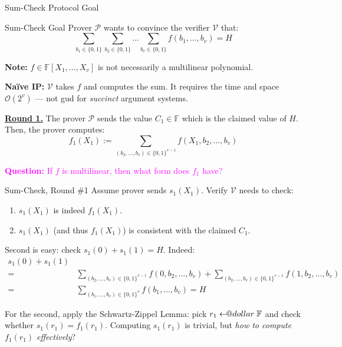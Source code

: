 \documentclass{zkdl-presentation-template}
\makeatletter
\newcommand\leftarrowS{\leftarrow\joinrel\smalldollar}
\newcommand{\smalldollar}{\mathrel{\mathpalette\small@dollar\relax}}
\newcommand{\small@dollar}[2]{%
  \vcenter{\hbox{%
    $#1\textnormal{\fontsize{0.7\dimexpr\f@size pt}{0}\selectfont\$}$%
  }}%
}
\makeatother
\begin{document}
    \begin{frame}{Sum-Check Protocol Goal}
        \begin{alertblock}{Sum-Check Goal}
            Prover $\mathcal{P}$ wants to convince the verifier $\mathcal{V}$ that:
            \begin{equation*}
                \sum_{b_1 \in \{0,1\}}\sum_{b_2 \in \{0,1\}}\dots \sum_{b_v \in \{0,1\}} f(b_1,\dots,b_v) = H
            \end{equation*}

            \pause\textbf{Note:} $f \in \mathbb{F}[X_1,\dots,X_v]$ is not necessarily
            a multilinear polynomial.\pause
        \end{alertblock}

        \textbf{Naïve IP:} $\mathcal{V}$ takes $f$ and computes the sum. It
        requires the time and space $\mathcal{O}(2^v)$ --- not gud for
        \textit{succinct} argument systems.\pause

        \underline{\textbf{Round 1.}} The prover $\mathcal{P}$ sends the value
        $C_1 \in \mathbb{F}$ which is the claimed value of $H$. \pause Then, the prover computes:
        \begin{equation*}
            f_1(X_1) := \sum_{(b_2,\dots,b_v) \in \{0,1\}^{v-1}}f(X_1,b_2,\dots,b_v)
        \end{equation*}
        
        \vspace{-12.5px}

        \pause\textcolor{magenta}{\textbf{Question:} If $f$ is multilinear, then what
        form does $f_1$ have?}
    \end{frame}

    \begin{frame}{Sum-Check, Round \#1}
        Assume prover sends $s_1(X_1)$. Verify $\mathcal{V}$ needs to check:
        \begin{enumerate}
            \item $s_1(X_1)$ is indeed $f_1(X_1)$.
            \item $s_1(X_1)$ (and thus $f_1(X_1)$) is consistent with the
            claimed $C_1$.
        \end{enumerate}

        \pause Second is easy: check $s_1(0) + s_1(1) = H$. Indeed:
        \begin{align*}
            s_1(0) + s_1(1) \\
            =&\sum_{(b_2,\dots,b_v) \in \{0,1\}^{v-1}}f(0,b_2,\dots,b_v) + \sum_{(b_2,\dots,b_v) \in \{0,1\}^{v-1}}f(1,b_2,\dots,b_v) \\
            =&\sum_{(b_1,\dots,b_v) \in \{0,1\}^v} f(b_1,\dots,b_v) = H
        \end{align*}

        \pause For the second, apply the Schwartz-Zippel Lemma: pick $r_1 \leftarrowS
        \mathbb{F}$ and check whether $s_1(r_1) = f_1(r_1)$. Computing
        $s_1(r_1)$ is trivial, but \textit{how to compute $f_1(r_1)$
        effectively}?
    \end{frame}
\end{document}
